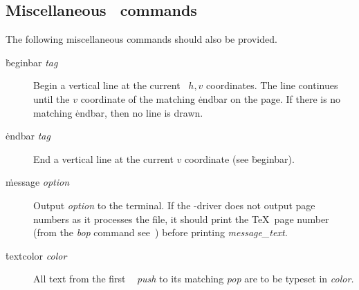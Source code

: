 \subsection{Miscellaneous \Special\ commands}
The following miscellaneous commands should also be provided.
\begin{description}
\item[\.{beginbar} {\it tag\/}] Begin a vertical line at the current
         \DVI\ $h,v$ coordinates. The line continues until the $v$
         coordinate of the matching \.{endbar} on the page. If there is
         no matching \.{endbar}, then no line is drawn.
\item[\.{endbar} {\it tag\/}] End a vertical line at the current $v$
         coordinate (see \.{beginbar}).
\item[\.{message} {\it option}] Output {\it option\/} to the terminal.
         If the \DVI-driver does not output page numbers as it processes
         the file, it should print the \TeX\ page number (from the {\it
         bop\/} command see~\cite{ware:dvitype}) before printing {\it
         message\_text.}
\item[\.{textcolor} {\it color}] All text from the first \DVI\ {\it
         push\/} to its matching {\it pop\/} are to be typeset in
         {\it color.\/}
\end{description}

%
%

